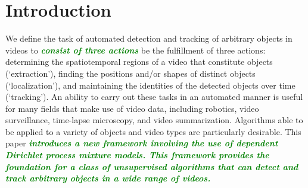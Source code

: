 \documentclass[twocolumn, final]{svjour3}
\newcommand{\willie}[1]{\textcolor{green}{\textsf{\emph{\textbf{\textcolor{green}{#1}}}}}}
\begin{document}

\section{Introduction}

We define the task of automated detection and tracking of arbitrary objects in videos to \willie{consist of three actions} be the fulfillment of three actions: determining the spatiotemporal regions of a video that constitute objects (`extraction'), finding the positions and/or shapes of distinct objects (`localization'), and maintaining the identities of the detected objects over time (`tracking'). An ability to carry out these tasks in an automated manner is useful for many fields that make use of video data, including robotics, video surveillance, time-lapse microscopy, and video summarization. Algorithms able to be applied to a variety of objects and video types are particularly desirable. This paper \willie{introduces a new framework involving the use of dependent Dirichlet process mixture models. This framework provides the foundation for a class of unsupervised algorithms that can detect and track arbitrary objects in a wide range of videos.} 
\end{document}
